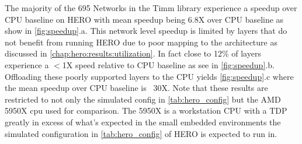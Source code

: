 The majority of the 695 Networks in the Timm library experience a speedup over
CPU baseline on HERO with mean speedup being 6.8X over CPU baseline as show in
\autoref{fig:speedup}.a. This network level speedup is limited by layers that do
not benefit from running HERO due to poor mapping to the architecture as
discussed in \autoref{chap:hero:results:utilization}. In fact close to 12\% of
layers experience a $<$1X speed relative to CPU baseline as see in
\autoref{fig:speedup}.b. Offloading these poorly supported layers to the CPU
yields \autoref{fig:speedup}.c where the mean speedup over CPU baseline is ~30X.
Note that these results are restricted to not only the simulated config in
\autoref{tab:hero_config} but the AMD 5950X cpu used for comparison. The 5950X
is a workstation CPU with a TDP greatly in excess of what's expected in the small
embedded environments the simulated configuration in \autoref{tab:hero_config}
of HERO is expected to run in.

